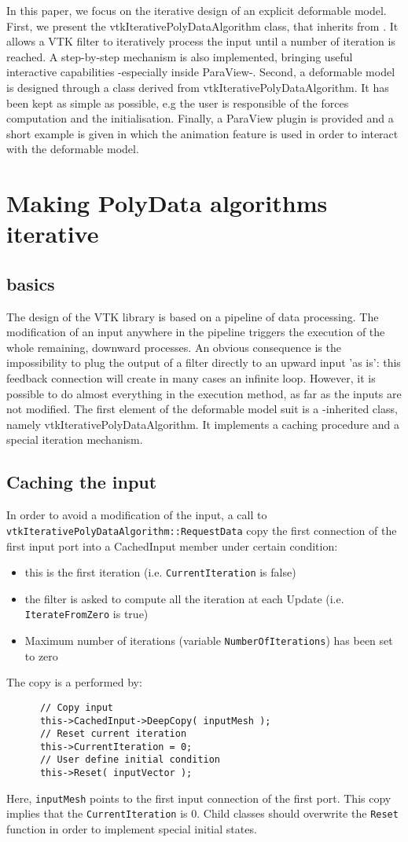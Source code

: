 \documentclass{InsightArticle}
\begin{document}
In this paper, we focus on the iterative design of an explicit deformable 
model. First, we present the vtkIterativePolyDataAlgorithm class, that 
inherits from . It allows a VTK filter to iteratively
process the input until a number of iteration is reached. A step-by-step
mechanism is also implemented, bringing useful interactive capabilities
-especially inside ParaView-. Second, a deformable model is designed through
a class derived from vtkIterativePolyDataAlgorithm. It has been kept as simple
as possible, e.g the user is responsible of the forces computation and the
initialisation. Finally, a ParaView plugin is provided and a short example 
is given in which the animation feature is used in order to interact with the 
deformable model.
%
\section{Making PolyData algorithms iterative}
\subsection{basics}
The design of the VTK library is based on a pipeline of data processing. The
modification of an input anywhere in the pipeline triggers the execution of the
whole remaining, downward processes. An obvious consequence is the 
impossibility to plug the output of a filter directly to an upward input 
'as is': this feedback connection will create in many cases an infinite loop.
However, it is possible to do almost everything in the execution method, as far
as the inputs are not modified. The first element of the deformable model suit
is a -inherited class, namely vtkIterativePolyDataAlgorithm.
It implements a caching procedure and a special iteration mechanism.
%
\subsection{Caching the input}
%
In order to avoid a modification of the input, a call to 
\verb!vtkIterativePolyDataAlgorithm::RequestData! copy the first connection of 
the first input port into a CachedInput member under certain condition:
\begin{itemize}
 \item this is the first iteration (i.e. \verb!CurrentIteration! is false)
 \item the filter is asked to compute all the iteration at each Update (i.e.
   \verb!IterateFromZero! is true)
 \item Maximum number of iterations (variable \verb!NumberOfIterations!) has 
been set to zero
\end{itemize}
The copy is a performed by:
\begin{verbatim}
      // Copy input
      this->CachedInput->DeepCopy( inputMesh );
      // Reset current iteration
      this->CurrentIteration = 0;
      // User define initial condition
      this->Reset( inputVector ); 
\end{verbatim}
%
Here, \verb!inputMesh! points to the first input connection of the first port.
This copy implies that the \verb!CurrentIteration! is 0. Child classes should
overwrite the \verb!Reset! function in order to implement special initial 
states.
%
\end{document}
